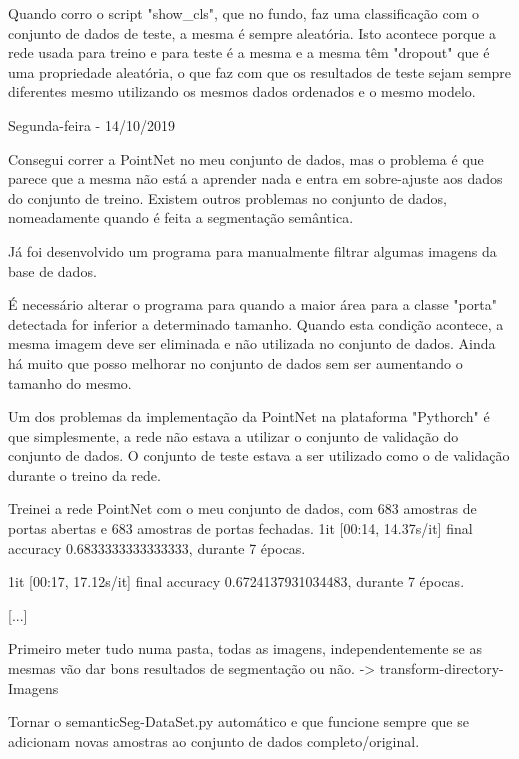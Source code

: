         Quando corro o script "show\_cls", que no fundo, faz uma classificação com o conjunto de dados de teste, a mesma é sempre aleatória. Isto acontece porque a rede usada para treino e para teste é a mesma e a mesma têm "dropout" que é uma propriedade aleatória, o que faz com que os resultados de teste sejam sempre diferentes mesmo utilizando os mesmos dados ordenados e o mesmo modelo.
        
        
        \bigskip
        
        Segunda-feira - 14/10/2019
        
        Consegui correr a PointNet no meu conjunto de dados, mas o problema é que parece que a mesma não está a aprender nada e entra em sobre-ajuste aos dados do conjunto de treino. Existem outros problemas no conjunto de dados, nomeadamente quando é feita a segmentação semântica.
        
        Já foi desenvolvido um programa para manualmente filtrar algumas imagens da base de dados.
        
        É necessário alterar o programa para quando a maior área para a classe "porta" detectada for inferior a determinado tamanho. Quando esta condição acontece, a mesma imagem deve ser eliminada e não utilizada no conjunto de dados. Ainda há muito que posso melhorar no conjunto de dados sem ser aumentando o tamanho do mesmo.
        
        Um dos problemas da implementação da PointNet na plataforma "Pythorch" é que simplesmente, a rede não estava a utilizar o conjunto de validação do conjunto de dados. O conjunto de teste estava a ser utilizado como o de validação durante o treino da rede. 
        
        Treinei a rede PointNet com o meu conjunto de dados, com 683 amostras de portas abertas e 683 amostras de portas fechadas.
        1it [00:14, 14.37s/it]
        final accuracy 0.6833333333333333, durante 7 épocas.

        1it [00:17, 17.12s/it]
        final accuracy 0.6724137931034483, durante 7 épocas.
        
        [...]
        
        Primeiro meter tudo numa pasta, todas as imagens, independentemente se as mesmas vão dar bons resultados de segmentação ou não. 
        -> transform-directory-Imagens
        
        Tornar o semanticSeg-DataSet.py automático e que funcione sempre que se adicionam novas amostras ao conjunto de dados completo/original.
        
